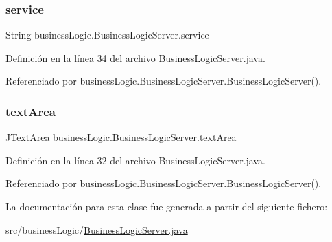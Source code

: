 \subsubsection{\texorpdfstring{service}{service}}
{\footnotesize\ttfamily String business\+Logic.\+Business\+Logic\+Server.\+service\hspace{0.3cm}{\ttfamily [package]}}



Definición en la línea 34 del archivo Business\+Logic\+Server.\+java.



Referenciado por business\+Logic.\+Business\+Logic\+Server.\+Business\+Logic\+Server().

\mbox{\label{classbusinessLogic_1_1BusinessLogicServer_aec137250843e53f480cd28952ca4afd7}} 
\subsubsection{\texorpdfstring{textArea}{textArea}}
{\footnotesize\ttfamily J\+Text\+Area business\+Logic.\+Business\+Logic\+Server.\+text\+Area\hspace{0.3cm}{\ttfamily [package]}}



Definición en la línea 32 del archivo Business\+Logic\+Server.\+java.



Referenciado por business\+Logic.\+Business\+Logic\+Server.\+Business\+Logic\+Server().



La documentación para esta clase fue generada a partir del siguiente fichero\+:\begin{DoxyCompactItemize}
\item 
src/business\+Logic/\mbox{\hyperlink{BusinessLogicServer_8java}{Business\+Logic\+Server.\+java}}\end{DoxyCompactItemize}
